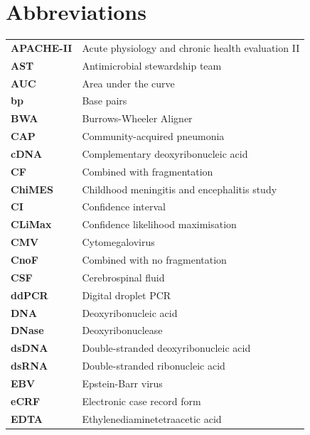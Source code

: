 \newpage
{}
\tableofcontents

\newpage
\listoffigures
{}

\newpage
\listoftables
{}

\chapter*{Abbreviations}

\begin{longtable}[l]{l l}
		\textbf{APACHE-II} & Acute physiology and chronic health evaluation II\\
		\textbf{AST} & Antimicrobial stewardship team\\
		\textbf{AUC} & Area under the curve\\
		\textbf{bp} & Base pairs\\
		\textbf{BWA} & Burrows-Wheeler Aligner\\
		\textbf{CAP} & Community-acquired pneumonia\\
		\textbf{cDNA} & Complementary deoxyribonucleic acid\\
		\textbf{CF} & Combined with fragmentation\\
		\textbf{ChiMES} & Childhood meningitis and encephalitis study\\
		\textbf{CI} & Confidence interval\\
		\textbf{CLiMax} & Confidence likelihood maximisation\\
		\textbf{CMV} & Cytomegalovirus\\
		\textbf{CnoF} & Combined with no fragmentation\\
		\textbf{CSF} & Cerebrospinal fluid\\
		\textbf{ddPCR} & Digital droplet PCR\\
		\textbf{DNA} & Deoxyribonucleic acid\\
		\textbf{DNase} & Deoxyribonuclease\\
		\textbf{dsDNA} & Double-stranded deoxyribonucleic acid\\
		\textbf{dsRNA} & Double-stranded ribonucleic acid\\
		\textbf{EBV} & Epstein-Barr virus\\
		\textbf{eCRF} & Electronic case record form\\
		\textbf{EDTA} & Ethylenediaminetetraacetic acid\\

\end{longtable}
